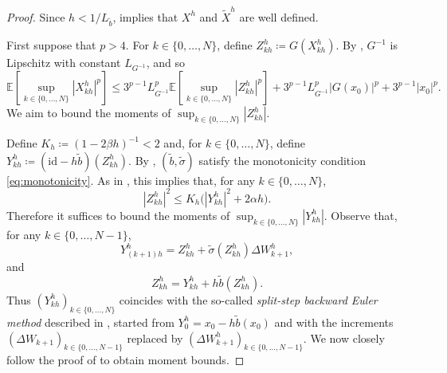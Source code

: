 \documentclass[onseside, final]{amsart}
\theoremstyle{definition}
\newcommand{\E}{\mathbb E}
\newcommand{\id}{\mathrm{id}}
\numberwithin{equation}{section}
\begin{document}
		\begin{proof}
			Since $h < 1/L_{\tilde b}$,  implies that $X^h$ and $\tilde X^h$ are well defined.
			
			First suppose that $p > 4$.
			For $k \in \{0, \dotsc, N\}$, define $Z^h_{kh} \coloneqq G(X^h_{kh})$. By , $G^{-1}$ is Lipschitz with constant $L_{G^{-1}}$, and so
			\begin{equation}\label{eq:lipschitz-moment}
				\E\!\left[\sup_{k \in \{0, \dotsc, N\}}|X^h_{kh}|^p\right]\! \leq 3^{p - 1}L_{G^{-1}}^p\E\!\left[\sup_{k \in \{0, \dotsc, N\}}|Z^h_{kh}|^p\right]\! + 3^{p - 1}L_{G^{-1}}^p|G(x_0)|^p + 3^{p - 1}|x_0|^p.
			\end{equation}
			We aim to bound the moments of $\sup_{k \in \{0, \dotsc, N\}}|Z^h_{kh}|$.
			
			Define $K_h \coloneqq (1 - 2 \beta h)^{-1} < 2$ and, for $k \in \{0, \dotsc, N\}$, define $Y^h_{kh} \coloneqq (\id - h \tilde b)(Z^h_{kh})$. By , $(\tilde b, \tilde \sigma)$ satisfy the monotonicity condition \eqref{eq:monotonicity}. As in \citep[Lemma 3.2]{MaSz13b}, this implies that, for any $k \in \{0, \dotsc, N\}$,
			\begin{equation}\label{eq:SSBE-bounds-BE}
				|Z^h_{kh}|^2 \leq K_h\bigl(|Y^h_{kh}|^2 + 2 \alpha h\bigr).
			\end{equation}
			Therefore it suffices to bound the moments of $\sup_{k \in \{0, \dotsc, N\}}|Y^h_{kh}|$. Observe that, for any $k \in \{0, \dotsc, N - 1\}$,
			\begin{equation}\label{eq:SSBE}
				Y^h_{(k + 1)h} = Z^h_{kh} + \tilde \sigma(Z^h_{kh})\Delta W^h_{k+1},
			\end{equation}
			and
			\begin{equation}
				Z^h_{kh} = Y^h_{kh} + h \tilde b(Z^h_{kh}).
			\end{equation}
			Thus $(Y^h_{kh})_{k \in \{0, \dotsc, N \}}$ coincides with the so-called \emph{split-step backward Euler method} described in \citep[Section 3.3]{HiMaSt02}, started from $Y^h_0 = x_0 - h \tilde b(x_0)$ and with the increments $(\Delta W_{k + 1})_{k \in \{0, \dotsc, N - 1\}}$ replaced by $(\Delta W^h_{k + 1})_{k \in \{0, \dotsc, N - 1\}}$. We now closely follow the proof of \citep[Lemma 3.7]{HiMaSt02} to obtain moment bounds.
			

\end{proof}
\end{document}
